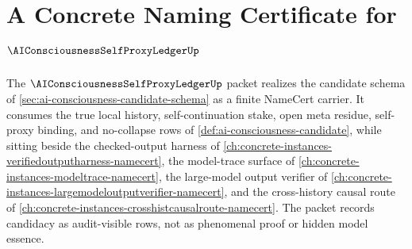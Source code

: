 \chapter{A Concrete Naming Certificate for $\AIConsciousnessSelfProxyLedgerUp$}
\label{ch:concrete-instances-ai-consciousness-self-proxy-ledger-namecert}

The $\AIConsciousnessSelfProxyLedgerUp$ packet realizes the candidate schema of \autoref{sec:ai-consciousness-candidate-schema} as a finite NameCert carrier. It consumes the true local history, self-continuation stake, open meta residue, self-proxy binding, and no-collapse rows of \autoref{def:ai-consciousness-candidate}, while sitting beside the checked-output harness of \autoref{ch:concrete-instances-verifiedoutputharness-namecert}, the model-trace surface of \autoref{ch:concrete-instances-modeltrace-namecert}, the large-model output verifier of \autoref{ch:concrete-instances-largemodeloutputverifier-namecert}, and the cross-history causal route of \autoref{ch:concrete-instances-crosshistcausalroute-namecert}. The packet records candidacy as audit-visible rows, not as phenomenal proof or hidden model essence.


